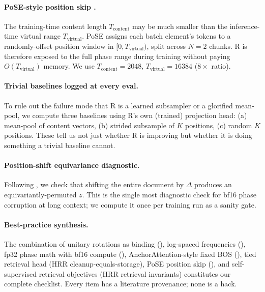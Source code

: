 \documentclass[10pt, twocolumn, a4paper]{article}
\begin{document}
\paragraph{PoSE-style position skip \cite{zhu2024pose}.} The training-time content length $T_{\text{content}}$ may be much smaller than the inference-time virtual range $T_{\text{virtual}}$. PoSE assigns each batch element's tokens to a randomly-offset position window in $[0, T_{\text{virtual}})$, split across $N=2$ chunks. R is therefore exposed to the full phase range during training without paying $O(T_{\text{virtual}})$ memory. We use $T_{\text{content}}=2048$, $T_{\text{virtual}}=16384$ ($8\times$ ratio).

\paragraph{Trivial baselines logged at every eval.} To rule out the failure mode that R is a learned subsampler or a glorified mean-pool, we compute three baselines using R's own (trained) projection head: (a) mean-pool of content vectors, (b) strided subsample of $K$ positions, (c) random $K$ positions. These tell us not just whether R is improving but whether it is doing something a trivial baseline cannot.

\paragraph{Position-shift equivariance diagnostic.} Following \cite{wang2024bf16rope}, we check that shifting the entire document by $\Delta$ produces an equivariantly-permuted $z$. This is the single most diagnostic check for bf16 phase corruption at long context; we compute it once per training run as a sanity gate.

\paragraph{Best-practice synthesis.} The combination of unitary rotations as binding (\cite{plate1995hrr}), log-spaced frequencies (\cite{su2021roformer}), fp32 phase math with bf16 compute (\cite{wang2024bf16rope}), AnchorAttention-style fixed BOS (\cite{wang2024bf16rope}), tied retrieval head (HRR cleanup-equals-storage), PoSE position skip (\cite{zhu2024pose}), and self-supervised retrieval objectives (HRR retrieval invariants) constitutes our complete checklist. Every item has a literature provenance; none is a hack.


\end{document}
